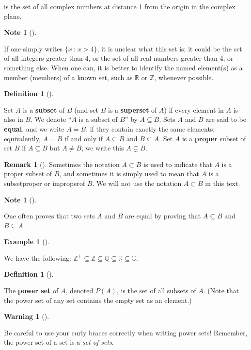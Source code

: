 \documentclass[10pt,]{book}
\newcommand{\terminology}[1]{\textbf{#1}}
\theoremstyle{plain}
\theoremstyle{definition}
\newtheorem{definition}[theorem]{Definition}
\theoremstyle{definition}
\newtheorem{remark}[theorem]{Remark}
\newtheorem{note}[theorem]{Note}
\newtheorem{warning}[theorem]{Warning}
\theoremstyle{definition}
\newtheorem{example}[theorem]{Example}
\theoremstyle{definition}
\numberwithin{equation}{section}
\def\Z{\mathbb{Z}}
\def\R{\mathbb{R}}
\def\Q{\mathbb{Q}}
\def\C{\mathbb{C}}
\begin{document}
    is the set of all complex numbers at
    distance 1 from the origin in the complex plane.
\begin{note}[]\label{note-2}

    If one simply writes \(\{x\,:\,x>4\}\),
    it is unclear what this set is; it could be the set of all
    integers greater than 4, or the set of all real numbers greater
    than 4, or something else. When one can, it is better to
    identify the named element(s) as a member (members) of a known
    set, such as \(\R\) or \(\Z\), whenever possible.
\end{note}
\begin{definition}[{}]\label{definition-4}

        Set \(A\) is a \terminology{subset} of \(B\) (and set \(B\) is a \terminology{superset} of \(A\)) if every element in \(A\) is also in \(B\). We
        denote ``\(A\) is a subset of \(B\)'' by \(A\subseteq B\). Sets \(A\)
        and \(B\) are said to be \terminology{equal}, and we write \(A=B\), if they
        contain exactly the same elements; equivalently, \(A=B\) if and
        only if \(A \subseteq B\) and \(B\subseteq A\). Set \(A\) is a \terminology{proper} subset of set \(B\) if \(A\subseteq B\) but \(A\neq B\); we
        write this \(A\subsetneq B\).
\label{notation-14}
\label{notation-15}
\end{definition}
\begin{remark}[]\label{remark-1}
 Sometimes the notation \(A\subset B\) is  used to
        indicate that \(A\) is a proper subset of \(B\), and sometimes it is simply used to mean that \(A\) is a subset\textemdash{}proper or improper\textemdash{}of \(B\). We will not use the notation \(A \subset B\) in this text. %
\end{remark}
\begin{note}[]\label{note-3}

      One often proves that two sets \(A\) and
      \(B\) are equal by proving that \(A\subseteq B\) and \(B\subseteq A\).
\end{note}
\begin{example}[]\label{example-2}

        We have the following: \(\Z^+ \subseteq \Z \subseteq \Q \subseteq \R \subseteq \C\).
\end{example}
\begin{definition}[{}]\label{definition-5}

        The \terminology{power set} of \(A\), denoted \(P(A)\), is the set of
        all subsets of \(A\). (Note that the power set of any set
        contains the empty set as an element.)
\label{notation-16}
\end{definition}
\begin{warning}[]\label{warning-2}

      Be careful to use your curly braces correctly when writing power sets!
      Remember, the power set of a set is a \emph{set of sets}.
\end{warning}
\par
\end{document}
